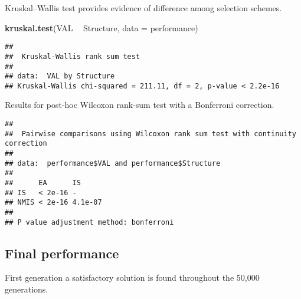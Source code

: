 \documentclass[]{book}
\newenvironment{Shaded}{\begin{snugshade}}{\end{snugshade}}
\newcommand{\DataTypeTok}[1]{\textcolor[rgb]{0.13,0.29,0.53}{#1}}
\newcommand{\KeywordTok}[1]{\textcolor[rgb]{0.13,0.29,0.53}{\textbf{#1}}}
\newcommand{\NormalTok}[1]{#1}
\newcommand{\OperatorTok}[1]{\textcolor[rgb]{0.81,0.36,0.00}{\textbf{#1}}}
\newcommand{\OtherTok}[1]{\textcolor[rgb]{0.56,0.35,0.01}{#1}}
\newcommand{\StringTok}[1]{\textcolor[rgb]{0.31,0.60,0.02}{#1}}
\begin{document}
Kruskal--Wallis test provides evidence of difference among selection schemes.

\begin{Shaded}
\begin{Highlighting}[]
\KeywordTok{kruskal.test}\NormalTok{(VAL }\OperatorTok{~}\StringTok{ }\NormalTok{Structure, }\DataTypeTok{data =}\NormalTok{ performance)}
\end{Highlighting}
\end{Shaded}

\begin{verbatim}
## 
##  Kruskal-Wallis rank sum test
## 
## data:  VAL by Structure
## Kruskal-Wallis chi-squared = 211.11, df = 2, p-value < 2.2e-16
\end{verbatim}

Results for post-hoc Wilcoxon rank-sum test with a Bonferroni correction.

\begin{Shaded}
\end{Shaded}

\begin{verbatim}
## 
##  Pairwise comparisons using Wilcoxon rank sum test with continuity correction 
## 
## data:  performance$VAL and performance$Structure 
## 
##      EA      IS     
## IS   < 2e-16 -      
## NMIS < 2e-16 4.1e-07
## 
## P value adjustment method: bonferroni
\end{verbatim}

\hypertarget{final-performance-8}{%
\subsection{Final performance}\label{final-performance-8}}

First generation a satisfactory solution is found throughout the 50,000 generations.
\end{document}
